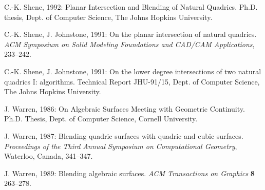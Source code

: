 \begin{thebibliography}{999}
     C.-K. Shene, 1992: 
     Planar Intersection and Blending of Natural Quadrics.
     Ph.D. thesis, Dept. of Computer Science, The Johns Hopkins
     University.

     C.-K. Shene, J. Johnstone, 1991:
     On the planar intersection of natural quadrics.
     {\em ACM Symposium on Solid Modeling Foundations and
     CAD/CAM Applications}, 233--242.

     C.-K. Shene, J. Johnstone, 1991: 
     On the lower degree intersections of two natural quadrics I: algorithms.
     Technical Report JHU-91/15, Dept. of Computer Science,
     The Johns Hopkins University.

     J. Warren, 1986:
     On Algebraic Surfaces Meeting with Geometric Continuity.
     Ph.D. Thesis, Dept. of Computer Science, Cornell University.

     J. Warren, 1987:
     Blending quadric surfaces with quadric and cubic surfaces.
     {\em Proceedings of the Third Annual Symposium on Computational Geometry},
     Waterloo, Canada, 341--347.

     J. Warren, 1989:
     Blending algebraic surfaces.
     {\em ACM Transactions on Graphics} {\bf 8} 263--278.

\end{thebibliography}



